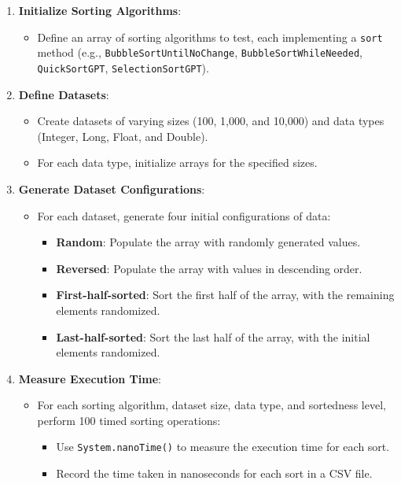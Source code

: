 \documentclass[unicode,11pt,a4paper,oneside,numbers=endperiod,openany]{scrartcl}
\begin{document}
    \begin{enumerate}
        \item \textbf{Initialize Sorting Algorithms}:
        \begin{itemize}
            \item Define an array of sorting algorithms to test, each implementing a \texttt{sort} method (e.g., \texttt{BubbleSortUntilNoChange}, \texttt{BubbleSortWhileNeeded}, \texttt{QuickSortGPT}, \texttt{SelectionSortGPT}).
        \end{itemize}
    
        \item \textbf{Define Datasets}:
        \begin{itemize}
            \item Create datasets of varying sizes (100, 1,000, and 10,000) and data types (Integer, Long, Float, and Double).
            \item For each data type, initialize arrays for the specified sizes.
        \end{itemize}
    
        \item \textbf{Generate Dataset Configurations}:
        \begin{itemize}
            \item For each dataset, generate four initial configurations of data:
            \begin{itemize}
                \item \textbf{Random}: Populate the array with randomly generated values.
                \item \textbf{Reversed}: Populate the array with values in descending order.
                \item \textbf{First-half-sorted}: Sort the first half of the array, with the remaining elements randomized.
                \item \textbf{Last-half-sorted}: Sort the last half of the array, with the initial elements randomized.
            \end{itemize}
        \end{itemize}
    
        \item \textbf{Measure Execution Time}:
        \begin{itemize}
            \item For each sorting algorithm, dataset size, data type, and sortedness level, perform 100 timed sorting operations:
            \begin{itemize}
                \item Use \texttt{System.nanoTime()} to measure the execution time for each sort.
                \item Record the time taken in nanoseconds for each sort in a CSV file.
            \end{itemize}
        \end{itemize}
    

\end{enumerate}
\end{document}
